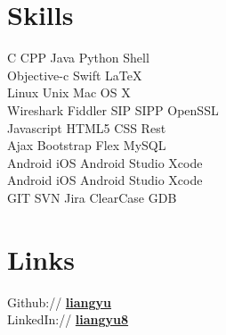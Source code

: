 \documentclass[letterpaper]{lyu-resume} %
\begin{document}
\begin{minipage}[t]{0.33\textwidth} %


\section{Skills}

C \textbullet{} CPP \textbullet{} Java \textbullet{} Python \textbullet{} Shell\\
Objective-c \textbullet{} Swift \textbullet{} \LaTeX\ \\ 
Linux \textbullet{} Unix \textbullet{} Mac OS X \\
Wireshark \textbullet{} Fiddler \textbullet{} SIP \textbullet{} SIPP \textbullet{} OpenSSL\\
Javascript \textbullet{} HTML5 \textbullet{} CSS \textbullet{} Rest \\
Ajax \textbullet{} Bootstrap \textbullet{} Flex \textbullet{} MySQL \\ 
Android \textbullet{} iOS \textbullet{} Android Studio \textbullet{} Xcode \\
Android \textbullet{} iOS \textbullet{} Android Studio \textbullet{} Xcode \\
GIT \textbullet{} SVN \textbullet{} Jira \textbullet{} ClearCase \textbullet{} GDB

\sectionspace %


\section{Links} 

Github:// \href{https://github.com/liangyu}{\bf liangyu} \\
LinkedIn:// \href{https://www.linkedin.com/in/liangyu8}{\bf liangyu8} \\

\sectionspace %




\end{minipage}
\end{document}
